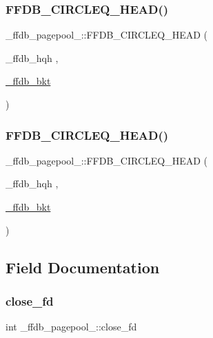 \subsubsection{\texorpdfstring{FFDB\_CIRCLEQ\_HEAD()}{FFDB\_CIRCLEQ\_HEAD()}\hspace{0.1cm}{\footnotesize\ttfamily [3/4]}}
{\footnotesize\ttfamily \+\_\+ffdb\+\_\+pagepool\+\_\+\+::\+F\+F\+D\+B\+\_\+\+C\+I\+R\+C\+L\+E\+Q\+\_\+\+H\+E\+AD (\begin{DoxyParamCaption}\item[{\+\_\+ffdb\+\_\+hqh}]{,  }\item[{\mbox{\hyperlink{struct__ffdb__bkt}{\+\_\+ffdb\+\_\+bkt}}}]{ }\end{DoxyParamCaption})}

\mbox{\label{struct__ffdb__pagepool___a96aa19721486d848d70d403dad214389}} 
\subsubsection{\texorpdfstring{FFDB\_CIRCLEQ\_HEAD()}{FFDB\_CIRCLEQ\_HEAD()}\hspace{0.1cm}{\footnotesize\ttfamily [4/4]}}
{\footnotesize\ttfamily \+\_\+ffdb\+\_\+pagepool\+\_\+\+::\+F\+F\+D\+B\+\_\+\+C\+I\+R\+C\+L\+E\+Q\+\_\+\+H\+E\+AD (\begin{DoxyParamCaption}\item[{\+\_\+ffdb\+\_\+hqh}]{,  }\item[{\mbox{\hyperlink{struct__ffdb__bkt}{\+\_\+ffdb\+\_\+bkt}}}]{ }\end{DoxyParamCaption})}



\subsection{Field Documentation}
\mbox{\label{struct__ffdb__pagepool___a994eb6de8b3d0330669e68339d841a72}} 
\subsubsection{\texorpdfstring{close\_fd}{close\_fd}}
{\footnotesize\ttfamily int \+\_\+ffdb\+\_\+pagepool\+\_\+\+::close\+\_\+fd}

